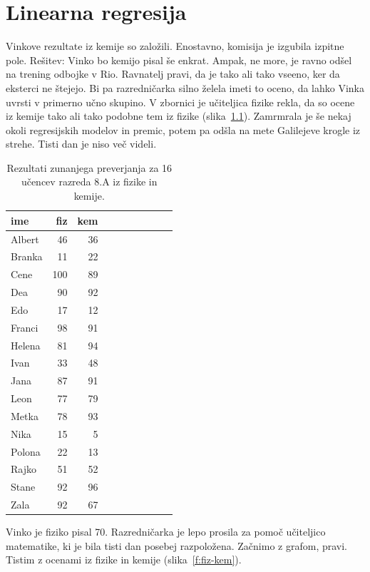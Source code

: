 \chapter{Linearna regresija}

Vinkove rezultate iz kemije so založili. Enostavno, komisija je
izgubila izpitne pole. Rešitev: Vinko bo kemijo pisal še
enkrat. Ampak, ne more, je ravno odšel na trening odbojke v
Rio. Ravnatelj pravi, da je tako ali tako vseeno, ker da eksterci ne
štejejo. Bi pa razredničarka silno želela imeti to oceno, da lahko
Vinka uvrsti v primerno učno skupino. V zbornici je učiteljica fizike
rekla, da so ocene iz kemije tako ali tako podobne tem iz fizike
(slika~\ref{f:fiz-kem-tab}). Zamrmrala je še nekaj okoli regresijskih
modelov in premic, potem pa odšla na mete Galilejeve krogle iz
strehe. Tisti dan je niso več videli.

\begin{table}[htbp]
\caption{Rezultati zunanjega preverjanja za 16 učencev razreda 8.A iz
  fizike in kemije.}
\label{f:fiz-kem-tab}
\begin{center}
\begin{tabular}{lrrrrrrrrr}
\toprule
ime & fiz & kem \\
\midrule
Albert & 46 & 36 \\
Branka & 11 & 22 \\
Cene & 100 & 89 \\
Dea & 90 & 92 \\
Edo & 17 & 12 \\
Franci & 98 & 91 \\
Helena & 81 & 94 \\
Ivan & 33 & 48 \\
Jana & 87 & 91 \\
Leon & 77 & 79 \\
Metka & 78 & 93 \\
Nika & 15 & 5 \\
Polona & 22 & 13 \\
Rajko & 51 & 52 \\
Stane & 92 & 96 \\
Zala & 92 & 67 \\
\bottomrule
\end{tabular}
\end{center}
\end{table}

Vinko je fiziko pisal 70. Razredničarka je lepo prosila za pomoč učiteljico
matematike, ki je bila tisti dan posebej razpoložena. Začnimo z
grafom, pravi. Tistim z ocenami iz fizike in kemije
(slika~\ref{f:fiz-kem}).

